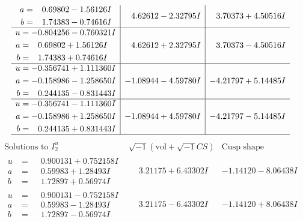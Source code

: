 \documentclass[1p]{elsarticle_modified}
\theoremstyle{definition}
\newcommand{\I}{\sqrt{-1}}
\begin{document}
$$\begin{array}{c|c|c}
\begin{aligned}
a &= \phantom{-}0.69802 - 1.56126 I \\
b &= \phantom{-}1.74383 - 0.74616 I\end{aligned}
 & \phantom{-}4.62612 - 2.32795 I & \phantom{-}3.70373 + 4.50516 I \\ \hline\begin{aligned}
u &= -0.804256 - 0.760321 I \\
a &= \phantom{-}0.69802 + 1.56126 I \\
b &= \phantom{-}1.74383 + 0.74616 I\end{aligned}
 & \phantom{-}4.62612 + 2.32795 I & \phantom{-}3.70373 - 4.50516 I \\ \hline\begin{aligned}
u &= -0.356741 + 1.111360 I \\
a &= -0.158986 - 1.258650 I \\
b &= \phantom{-}0.244135 - 0.831443 I\end{aligned}
 & -1.08944 - 4.59780 I & -4.21797 + 5.14485 I \\ \hline\begin{aligned}
u &= -0.356741 - 1.111360 I \\
a &= -0.158986 + 1.258650 I \\
b &= \phantom{-}0.244135 + 0.831443 I\end{aligned}
 & -1.08944 + 4.59780 I & -4.21797 - 5.14485 I\\
 \hline 
 \end{array}$$\newpage$$\begin{array}{c|c|c}  
\text{Solutions to }I^u_{2}& \I (\text{vol} + \sqrt{-1}CS) & \text{Cusp shape}\\
 \hline 
\begin{aligned}
u &= \phantom{-}0.900131 + 0.752158 I \\
a &= \phantom{-}0.59983 + 1.28493 I \\
b &= \phantom{-}1.72897 + 0.56974 I\end{aligned}
 & \phantom{-}3.21175 + 6.43302 I & -1.14120 - 8.06438 I \\ \hline\begin{aligned}
u &= \phantom{-}0.900131 - 0.752158 I \\
a &= \phantom{-}0.59983 - 1.28493 I \\
b &= \phantom{-}1.72897 - 0.56974 I\end{aligned}
 & \phantom{-}3.21175 - 6.43302 I & -1.14120 + 8.06438 I \\ \hline\begin{aligned}

\end{aligned}
\end{array}$$
\end{document}
